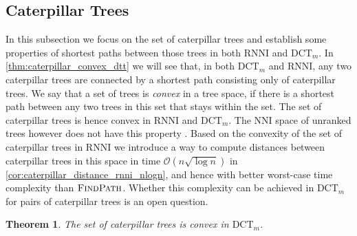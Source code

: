 \documentclass[11pt]{amsart}
\newtheorem{theorem}{Theorem}
\newcommand{\rnni}{\mathrm{RNNI}}
\newcommand{\findpath}{\textsc{FindPath}}
\newcommand{\nni}{\mathrm{NNI}}
\newcommand{\dct}{\mathrm{DCT}}
\renewcommand{\O}{\mathcal O}
\newcommand{\summary}[1]{} %
\begin{document}
\subsection{Caterpillar Trees}
\label{section:caterpillar_convex}

\summary{Defining Caterpillar trees. Why are they interesting?}
In this subsection we focus on the set of caterpillar trees and establish some properties of shortest paths between those trees in both $\rnni$ and $\dct_m$.
In \autoref{thm:caterpillar_convex_dtt} we will see that, in both $\dct_m$ and $\rnni$, any two caterpillar trees are connected by a shortest path consisting only of caterpillar trees.
We say that a set of trees is \emph{convex} in a tree space, if there is a shortest path between any two trees in this set that stays within the set.
The set of caterpillar trees is hence convex in $\rnni$ and $\dct_m$.
The $\nni$ space of unranked trees however does not have this property \autocite{Gavryushkin2018-ol}.
Based on the convexity of the set of caterpillar trees in $\rnni$ we introduce a way to compute distances between caterpillar trees in this space in time $\O(n \sqrt{\log n})$ in \autoref{cor:caterpillar_distance_rnni_nlogn}, and hence with better worst-case time complexity than $\findpath$.
Whether this complexity can be achieved in $\dct_m$ for pairs of caterpillar trees is an open question.

\begin{theorem}
	The set of caterpillar trees is convex in $\dct_m$.
	\label{thm:caterpillar_convex_dtt}
\end{theorem}
\end{document}
